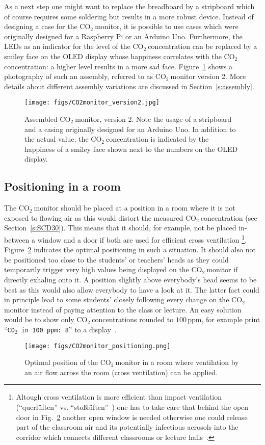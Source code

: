 \documentclass[12pt,a4paper]{article}
\newcommand{\coo}{\ensuremath{\mathrm{CO_2}~}}
\begin{document}
As a next step one might want to replace the breadboard by a stripboard which of course requires some soldering but results in a more robust device. Instead of designing a case for the \coo monitor, it is possible to use cases which were originally designed for a Raspberry Pi or an Arduino Uno. Furthermore, the LEDs as an indicator for the level of the \coo concentration can be replaced by a smiley face on the OLED display whose happiness correlates with the \coo concentration: a higher level results in a more sad face. Figure~\ref{f:CO2_monitor_version2} shows a photography of such an assembly, referred to as \coo monitor version 2. More details about different assembly variations are discussed in Section~\ref{s:assembly}.
\begin{figure}[t]
\centering
\texttt{[image: figs/CO2monitor\_version2.jpg]}
\caption{Assembled \coo monitor, version 2. Note the usage of a stripboard and a casing originally designed for an Arduino Uno. In addition to the actual value, the \coo concentration is indicated by the happiness of a smiley face shown next to the numbers on the OLED display.}
\label{f:CO2_monitor_version2}
\end{figure}

\subsection{Positioning in a room}
The \coo monitor should be placed at a position in a room where it is not exposed to flowing air as this would distort the measured \coo concentration (see Section~\ref{s:SCD30}). This means that it should, for example, not be placed in-between a window and a door if both are used for efficient cross ventilation%
\footnote{Altough cross ventilation is more efficient than impact ventilation (``querlüften'' vs. ``stoßlüften''~\cite{GUARDIAN2020}) one has to take care that behind the open door in Fig.~\ref{f:CO2_monitor_positioning} another open window is needed otherwise one could release part of the classroom air and its potentially infectious aerosols into the corridor which connects different classrooms or lecture halls~\cite{STAHMER2020}.}. 
Figure~\ref{f:CO2_monitor_positioning} indicates the optimal positioning in such a situation. It should also not be positioned too close to the students' or teachers' heads as they could temporarily trigger very high values being displayed on the \coo monitor if directly exhaling onto it. A position slightly above everybody's head seems to be best as this would also allow everybody to have a look at it. The latter fact could in principle lead to some students' closely following every change on the \coo monitor instead of paying attention to the class or lecture. An easy solution would be to show only \coo concentrations rounded to $100\,\mathrm{ppm}$, for example print 
``\texttt{CO$_2$ in 100 ppm: 8}'' to a display~\cite{STAHMER2020}.
\begin{figure}[tb]
\centering
\texttt{[image: figs/CO2monitor\_positioning.png]}
\caption{Optimal position of the \coo monitor in a room where ventilation by an air flow across the room (cross ventilation) can be applied.}
\label{f:CO2_monitor_positioning}
\end{figure}
\end{document}
